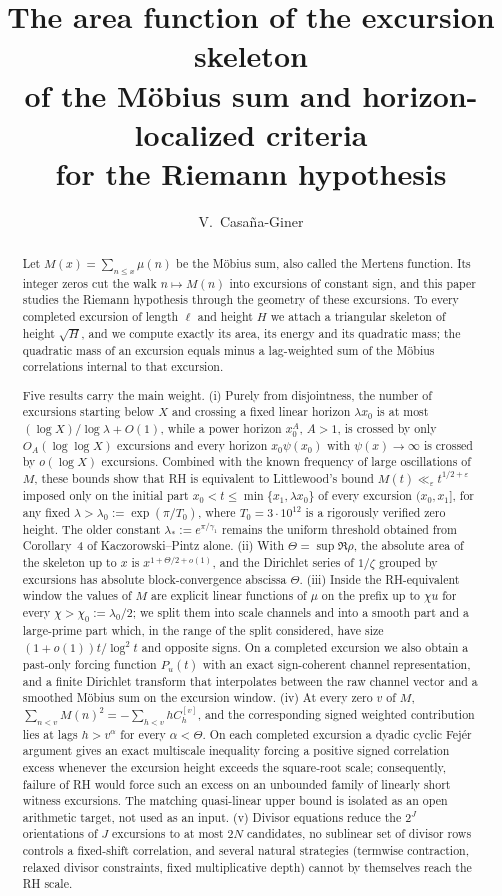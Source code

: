 \documentclass[11pt,reqno]{amsart}
\title[The excursion skeleton of the Möbius sum]{The area function of the excursion skeleton\\ of the Möbius sum and
horizon-localized criteria\\ for the Riemann hypothesis}
\author{V.~Casa\~na-Giner}
\date{}
\numberwithin{equation}{section}
\theoremstyle{plain}
\theoremstyle{definition}
\theoremstyle{remark}
\newcommand{\eps}{\varepsilon}
\begin{document}
\begin{abstract}
Let $M(x)=\sum_{n\le x}\mu(n)$ be the Möbius sum, also called the Mertens
function. Its integer zeros cut the walk $n\mapsto M(n)$ into excursions of
constant sign, and this paper studies the Riemann hypothesis through the
geometry of these excursions. To every completed excursion of length $\ell$
and height $H$ we attach a triangular skeleton of height $\sqrt H$, and we
compute exactly its area, its energy and its quadratic mass; the quadratic
mass of an excursion equals minus a lag-weighted sum of the Möbius
correlations internal to that excursion.

Five results carry the main weight. (i) Purely from disjointness, the number
of excursions starting below $X$ and crossing a fixed linear horizon
$\lambda x_0$ is at most $(\log X)/\log\lambda+O(1)$, while a power horizon
$x_0^A$, $A>1$, is crossed by only $O_A(\log\log X)$ excursions and every
horizon $x_0\psi(x_0)$ with $\psi(x)\to\infty$ is crossed by $o(\log X)$
excursions. Combined with the known frequency of large oscillations of $M$,
these bounds show that RH is equivalent to Littlewood's bound
$M(t)\ll_\eps t^{1/2+\eps}$ imposed only on the initial part
$x_0<t\le\min\{x_1,\lambda x_0\}$ of every excursion $(x_0,x_1]$, for any
fixed $\lambda>\lambda_0:=\exp(\pi/T_0)$, where $T_0=3\cdot10^{12}$ is a
rigorously verified zero height. The older constant
$\lambda_*:=e^{\pi/\gamma_1}$ remains the uniform threshold obtained from
Corollary~4 of Kaczorowski--Pintz alone. (ii) With $\Theta=\sup\Re\rho$, the absolute area of the skeleton up
to $x$ is $x^{1+\Theta/2+o(1)}$, and the Dirichlet series of $1/\zeta$
grouped by excursions has absolute block-convergence abscissa $\Theta$. (iii) Inside the RH-equivalent window the values of
$M$ are explicit linear functions of $\mu$ on the prefix up to $\chi u$ for
every $\chi>\chi_0:=\lambda_0/2$; we split them into scale channels and
into a smooth part and a large-prime part which, in the range of the split
considered, have size $(1+o(1))t/\log^2t$ and opposite signs.  On a completed
excursion we also obtain a past-only forcing function $P_u(t)$ with an exact
sign-coherent channel representation, and a finite Dirichlet transform that
interpolates between the raw channel vector and a smoothed M\"obius sum on
the excursion window.
(iv) At every zero $v$ of $M$,
$\sum_{n<v}M(n)^2=-\sum_{h<v}hC_h^{[v]}$, and the corresponding signed weighted contribution lies at
lags $h>v^\alpha$ for every $\alpha<\Theta$. On each completed excursion a
dyadic cyclic Fej\'er argument gives an exact multiscale inequality forcing a
positive signed correlation excess whenever the excursion height exceeds the
square-root scale; consequently, failure of RH would force such an excess on
an unbounded family of linearly short witness excursions. The matching
quasi-linear upper bound is isolated as an open arithmetic target, not used
as an input. (v) Divisor equations reduce the $2^J$ orientations of $J$
excursions to at most $2N$ candidates, no sublinear set of divisor rows
controls a fixed-shift correlation, and several natural strategies
(termwise contraction, relaxed divisor constraints, fixed multiplicative
depth) cannot by themselves reach the RH scale.


\end{abstract}
\end{document}
